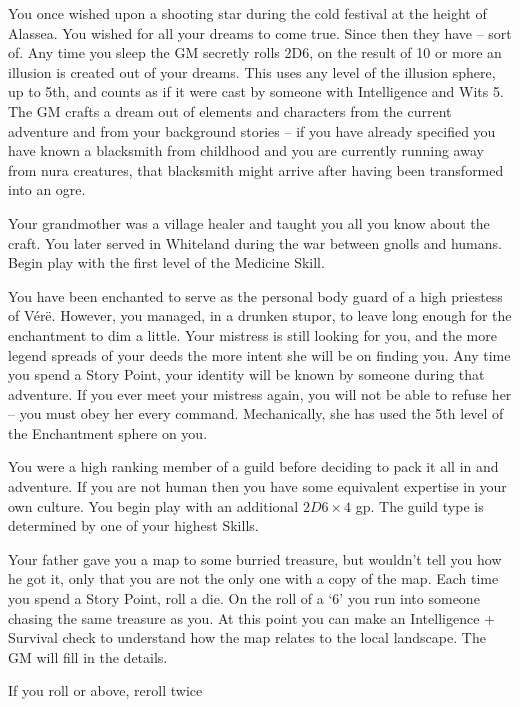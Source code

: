 \begin{list}{\addtocounter{list}{1}\textbf{:}}{\raggedleft}
\item{You once wished upon a shooting star during the cold festival at the height of Alassea. You wished for all your dreams to come true.  Since then they have -- sort of.  Any time you sleep the GM secretly rolls 2D6, on the result of 10 or more an illusion is created out of your dreams.  This uses any level of the illusion sphere, up to 5th, and counts as if it were cast by someone with Intelligence and Wits 5.  The GM crafts a dream out of elements and characters from the current adventure and from your background stories -- if you have already specified you have known a blacksmith from childhood and you are currently running away from nura creatures, that blacksmith might arrive after having been transformed into an ogre.}

\item{Your grandmother was a village healer and taught you all you know about the craft. You later served in Whiteland during the war between gnolls and humans.  Begin play with the first level of the Medicine Skill.}

\item{You have been enchanted to serve as the personal body guard of a high priestess of V\'{e}r\"{e}.  However, you managed, in a drunken stupor, to leave long enough for the enchantment to dim a little.  Your mistress is still looking for you, and the more legend spreads of your deeds the more intent she will be on finding you.  Any time you spend a Story Point, your identity will be known by someone during that adventure.  If you ever meet your mistress again, you will not be able to refuse her -- you must obey her every command.  Mechanically, she has used the 5th level of the Enchantment sphere on you.}

\item{You were a high ranking member of a guild before deciding to pack it all in and adventure.  If you are not human then you have some equivalent expertise in your own culture.  You begin play with an additional $2D6\times4$ gp.  The guild type is determined by one of your highest Skills.}

\item{Your father gave you a map to some burried treasure, but wouldn't tell you how he got it, only that you are not the only one with a copy of the map.  Each time you spend a Story Point, roll a die.  On the roll of a `6' you run into someone chasing the same treasure as you.  At this point you can make an Intelligence + Survival check to understand how the map relates to the local landscape.  The GM will fill in the details.}

\item{If you roll  or above, reroll twice}

\end{list}
